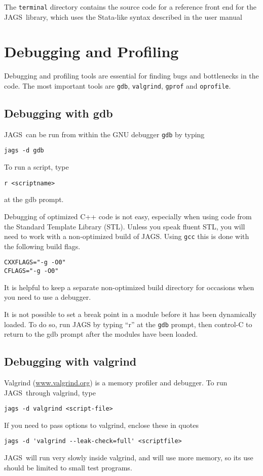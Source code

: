 \documentclass[11pt, a4paper, titlepage]{report}
\newcommand{\JAGS}{\textsf{JAGS}}
\begin{document}
The \texttt{terminal} directory contains the source code for a
reference front end for the \JAGS\ library, which uses the
\textsf{Stata}-like syntax described in the user manual

\chapter{Debugging and Profiling}
\label{chapter:debugging}

Debugging and profiling tools are essential for finding bugs and
bottlenecks in the code.  The most important tools are \texttt{gdb},
\texttt{valgrind}, \texttt{gprof} and \texttt{oprofile}.

\section{Debugging with gdb}

\JAGS\ can be run from within the GNU debugger \texttt{gdb} by typing
\begin{verbatim}
jags -d gdb
\end{verbatim}
To run a script, type
\begin{verbatim}
r <scriptname>
\end{verbatim}
at the gdb prompt. 

Debugging of optimized C++ code is not easy, especially when using
code from the Standard Template Library (STL).  Unless you speak
fluent STL, you will need to work with a non-optimized build of
\JAGS. Using \verb+gcc+ this is done with the following build flags.
\begin{verbatim}
CXXFLAGS="-g -O0"
CFLAGS="-g -O0"
\end{verbatim}
It is helpful to keep a separate non-optimized build directory for
occasions when you need to use a debugger.

It is not possible to set a break point in a module before it has
been dynamically loaded. To do so, run JAGS by typing ``r'' at the
\verb+gdb+ prompt, then control-C to return to the gdb prompt after
the modules have been loaded.

\section{Debugging with valgrind}

Valgrind (\url{www.valgrind.org}) is a memory profiler and
debugger. To run \JAGS\ through valgrind, type
\begin{verbatim}
jags -d valgrind <script-file>
\end{verbatim}
If you need to pass options to valgrind, enclose these in quotes
\begin{verbatim}
jags -d 'valgrind --leak-check=full' <scriptfile>
\end{verbatim}
\JAGS\ will run very slowly inside valgrind, and will use more memory,
so its use should be limited to small test programs.
\end{document}

